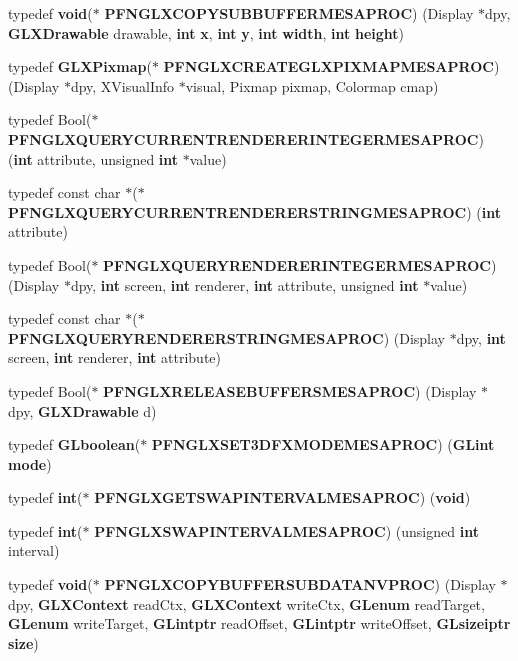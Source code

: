 \begin{DoxyCompactItemize}
\item 
typedef {\bf void}($\ast$ {\bf P\+F\+N\+G\+L\+X\+C\+O\+P\+Y\+S\+U\+B\+B\+U\+F\+F\+E\+R\+M\+E\+S\+A\+P\+R\+OC}) (Display $\ast$dpy, {\bf G\+L\+X\+Drawable} drawable, {\bf int} {\bf x}, {\bf int} {\bf y}, {\bf int} {\bf width}, {\bf int} {\bf height})
\item 
typedef {\bf G\+L\+X\+Pixmap}($\ast$ {\bf P\+F\+N\+G\+L\+X\+C\+R\+E\+A\+T\+E\+G\+L\+X\+P\+I\+X\+M\+A\+P\+M\+E\+S\+A\+P\+R\+OC}) (Display $\ast$dpy, X\+Visual\+Info $\ast$visual, Pixmap pixmap, Colormap cmap)
\item 
typedef Bool($\ast$ {\bf P\+F\+N\+G\+L\+X\+Q\+U\+E\+R\+Y\+C\+U\+R\+R\+E\+N\+T\+R\+E\+N\+D\+E\+R\+E\+R\+I\+N\+T\+E\+G\+E\+R\+M\+E\+S\+A\+P\+R\+OC}) ({\bf int} attribute, unsigned {\bf int} $\ast$value)
\item 
typedef const char $\ast$($\ast$ {\bf P\+F\+N\+G\+L\+X\+Q\+U\+E\+R\+Y\+C\+U\+R\+R\+E\+N\+T\+R\+E\+N\+D\+E\+R\+E\+R\+S\+T\+R\+I\+N\+G\+M\+E\+S\+A\+P\+R\+OC}) ({\bf int} attribute)
\item 
typedef Bool($\ast$ {\bf P\+F\+N\+G\+L\+X\+Q\+U\+E\+R\+Y\+R\+E\+N\+D\+E\+R\+E\+R\+I\+N\+T\+E\+G\+E\+R\+M\+E\+S\+A\+P\+R\+OC}) (Display $\ast$dpy, {\bf int} screen, {\bf int} renderer, {\bf int} attribute, unsigned {\bf int} $\ast$value)
\item 
typedef const char $\ast$($\ast$ {\bf P\+F\+N\+G\+L\+X\+Q\+U\+E\+R\+Y\+R\+E\+N\+D\+E\+R\+E\+R\+S\+T\+R\+I\+N\+G\+M\+E\+S\+A\+P\+R\+OC}) (Display $\ast$dpy, {\bf int} screen, {\bf int} renderer, {\bf int} attribute)
\item 
typedef Bool($\ast$ {\bf P\+F\+N\+G\+L\+X\+R\+E\+L\+E\+A\+S\+E\+B\+U\+F\+F\+E\+R\+S\+M\+E\+S\+A\+P\+R\+OC}) (Display $\ast$dpy, {\bf G\+L\+X\+Drawable} d)
\item 
typedef {\bf G\+Lboolean}($\ast$ {\bf P\+F\+N\+G\+L\+X\+S\+E\+T3\+D\+F\+X\+M\+O\+D\+E\+M\+E\+S\+A\+P\+R\+OC}) ({\bf G\+Lint} {\bf mode})
\item 
typedef {\bf int}($\ast$ {\bf P\+F\+N\+G\+L\+X\+G\+E\+T\+S\+W\+A\+P\+I\+N\+T\+E\+R\+V\+A\+L\+M\+E\+S\+A\+P\+R\+OC}) ({\bf void})
\item 
typedef {\bf int}($\ast$ {\bf P\+F\+N\+G\+L\+X\+S\+W\+A\+P\+I\+N\+T\+E\+R\+V\+A\+L\+M\+E\+S\+A\+P\+R\+OC}) (unsigned {\bf int} interval)
\item 
typedef {\bf void}($\ast$ {\bf P\+F\+N\+G\+L\+X\+C\+O\+P\+Y\+B\+U\+F\+F\+E\+R\+S\+U\+B\+D\+A\+T\+A\+N\+V\+P\+R\+OC}) (Display $\ast$dpy, {\bf G\+L\+X\+Context} read\+Ctx, {\bf G\+L\+X\+Context} write\+Ctx, {\bf G\+Lenum} read\+Target, {\bf G\+Lenum} write\+Target, {\bf G\+Lintptr} read\+Offset, {\bf G\+Lintptr} write\+Offset, {\bf G\+Lsizeiptr} {\bf size})

\end{DoxyCompactItemize}
